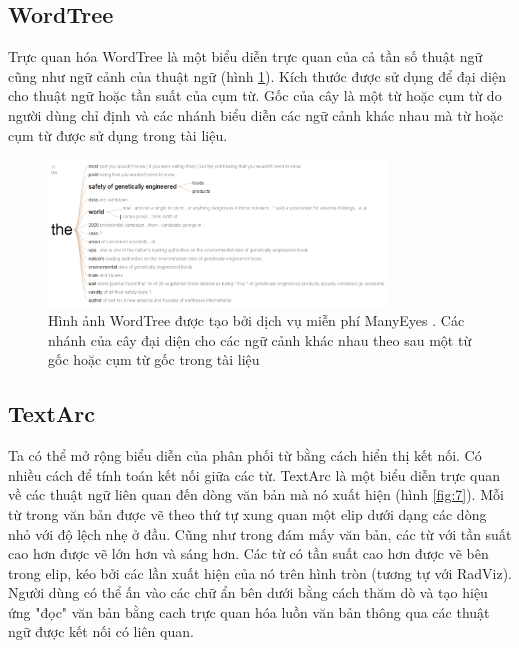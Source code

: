 \documentclass[14pt, a4paper]{article}
\numberwithin{equation}{section}
\numberwithin{figure}{section}
\numberwithin{dl}{section}
\numberwithin{md}{section}
\numberwithin{bd}{section}
\numberwithin{dn}{section}
\numberwithin{hq}{section}
\begin{document}
    \subsection{WordTree}

    Trực quan hóa WordTree \cite{450} là một biểu diễn trực quan của cả tần số thuật ngữ cũng như ngữ cảnh của thuật ngữ (hình \ref{fig:6}).
    Kích thước được sử dụng để đại diện cho thuật ngữ hoặc tần suất của cụm từ.
    Gốc của cây là một từ hoặc cụm từ do người dùng chỉ định và các nhánh biểu diễn các ngữ cảnh khác nhau mà từ hoặc cụm từ được sử dụng trong tài liệu.


    \begin{figure}[h!]
        \centering
        \includegraphics[width=0.8\textwidth]{6.png}
        \caption{Hình ảnh WordTree được tạo bởi dịch vụ miễn phí ManyEyes \cite{196}.
        Các nhánh của cây đại diện cho các ngữ cảnh khác nhau theo sau một từ gốc hoặc cụm từ gốc trong tài liệu}
        \label{fig:6}
    \end{figure}


    \subsection{TextArc}

    Ta có thể mở rộng biểu diễn của phân phối từ bằng cách hiển thị kết nối.
    Có nhiều cách để tính toán kết nối giữa các từ.
    TextArc \cite{312} là một biểu diễn trực quan về các thuật ngữ liên quan đến dòng văn bản mà nó xuất hiện (hình \ref{fig:7}).
    Mỗi từ trong văn bản được vẽ theo thứ tự xung quan một elip dưới dạng các dòng nhỏ với độ lệch nhẹ ở đầu.
    Cũng như trong đám mấy văn bản, các từ với tần suất cao hơn được vẽ lớn hơn và sáng hơn.
    Các từ có tần suất cao hơn được vẽ bên trong elip, kéo bởi các lần xuất hiện của nó trên hình tròn (tương tự với RadViz).
    Người dùng có thể ấn vào các chữ ẩn bên dưới bằng cách thăm dò và tạo hiệu ứng "đọc" văn bản bằng cach trực quan hóa luồn văn bản thông qua các thuật ngữ được kết nối có liên quan.
\end{document}
